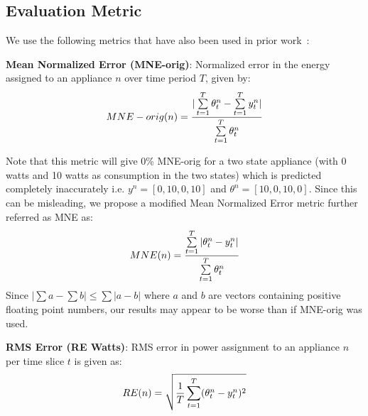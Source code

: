 \documentclass[conference]{IEEEtran}
\newcommand{\figref}[1]{Figure~\ref{#1}}
\begin{document}
\subsection{Evaluation Metric}
\vspace{-2mm}
\label{sec:metrics}
\noindent We use the following metrics that have also been used in prior work~\cite{parson2012_aaai,redd}:

\noindent\textbf{Mean Normalized Error (MNE-orig)}: Normalized error in the energy assigned to an appliance $n$ over time period $T$, given by:
\vspace{-5mm}
\begin{equation}
MNE-orig(n)=\frac{|\sum\limits_{t=1}^{T}\theta_t^n-\sum\limits_{t=1}^{T}y_t^n|}{\sum\limits_{t=1}^{T}\theta_t^n} 
\vspace{-2mm}
\end{equation} 

\noindent Note that this metric will give 0\% MNE-orig for a two state appliance (with 0 watts and 10 watts as consumption in the two states) which is predicted completely inaccurately i.e. $y^n=[0,10,0,10]$ and $\theta^n=[10,0,10,0]$. Since this can be misleading, we propose a modified Mean Normalized Error metric further referred as MNE as:
\vspace{-2mm}
\begin{equation}
MNE(n)=\frac{\sum\limits_{t=1}^{T}|\theta_t^n-y_t^n|}{\sum\limits_{t=1}^{T}\theta_t^n} 
\vspace{-2mm}
\end{equation} 
\noindent Since $|\sum a-\sum b| \le \sum|a-b|$ where $a$ and $b$ are vectors containing positive floating point numbers, our results may appear to be worse than if MNE-orig was used. 

\noindent\textbf{RMS Error (RE Watts)}: RMS error in power assignment to an appliance $n$ per time slice $t$ is given as:
\vspace{-2mm}
\begin{equation}
RE(n)=\sqrt{\frac{1}{T}\sum\limits_{t=1}^{T}(\theta_t^n-y_t^n)^2}
\vspace{-2mm}
\end{equation}
\end{document}
